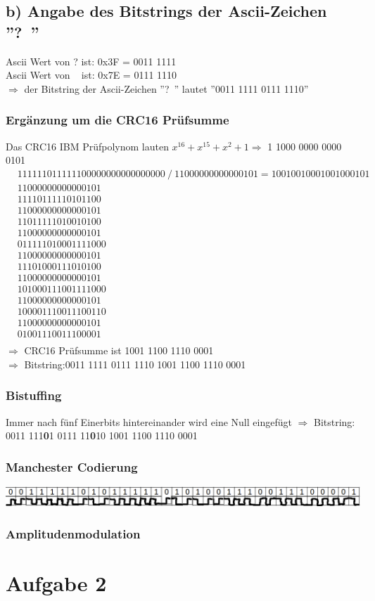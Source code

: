 \documentclass[numbers=noendperiod]{scrartcl}
\begin{document}
\subsection{b) Angabe des Bitstrings der Ascii-Zeichen ''?~''}
Ascii Wert von ? ist: 0x3F = 0011 1111 \\
Ascii Wert von ~ ist: 0x7E = 0111 1110 \\
\(\Rightarrow \) der Bitstring der Ascii-Zeichen ''?~'' lautet ''0011 1111 0111 1110''
\subsubsection*{Ergänzung um die CRC16 Prüfsumme}
Das CRC16 IBM Prüfpolynom lauten \(x^{16}+x^{15}+x^2 + 1 \Rightarrow \) 1 1000 0000 0000 0101 \\
  \begin{align*}
&11 1111 0111 1110 0000 0000 0000 0000 \ / \ 1 1000 0000 0000 0101 =  10010010001001000101&\\
&11 0000 0000 0000 101&\\
   &1111 0111 1101 0110 0&\\
   &1100 0000 0000 0010 1&\\
     &11 0111 1101 0010 100&\\
	 &11 0000 0000 0000 101&\\
		&0111 1101 0001 1110 00&\\
		 &110 0000 0000 0001 01&\\
		   &1 1101 0001 1101 0100&\\
		   &1 1000 0000 0000 0101&\\
		      &101 0001 1100 1111 000&\\
		       &11 0000 0000 0000 101&\\
		       &10 0001 1100 1110 0110&\\
		        &1 1000 0000 0000 0101&\\
		        &0 1001 1100 1110 0001&\\
		        \end{align*}
		        \(\Rightarrow\) CRC16 Prüfsumme ist 1001 1100 1110 0001\\
		        \(\Rightarrow\) Bitstring:0011 1111 0111 1110 1001 1100 1110 0001
\subsubsection*{Bistuffing}
Immer nach fünf Einerbits hintereinander wird eine Null eingefügt
 \(\Rightarrow\) Bitstring: 0011 111\textbf{0}1 0111 11\textbf{0}10 1001 1100 1110 0001
\subsubsection*{Manchester Codierung}
\includegraphics[width=1.0\textwidth]{manchester.png}
\subsubsection*{Amplitudenmodulation}
\section*{Aufgabe 2}
\end{document}
